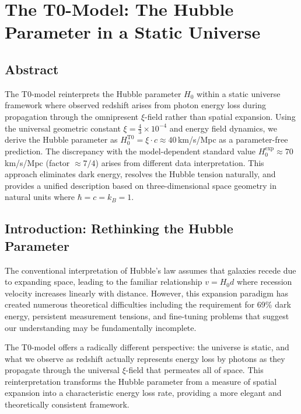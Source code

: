 \chapter{The T0-Model: The Hubble Parameter in a Static Universe \\}

\section*{Abstract}
		The T0-model reinterprets the Hubble parameter $H_0$ within a static universe framework where observed redshift arises from photon energy loss during propagation through the omnipresent $\xi$-field rather than spatial expansion. Using the universal geometric constant $\xi = \frac{4}{3} \times 10^{-4}$ and energy field dynamics, we derive the Hubble parameter as $H_0^{\text{T0}} = \xi \cdot c \approx 40\,$km/s/Mpc as a parameter-free prediction. The discrepancy with the model-dependent standard value $H_0^{\text{exp}} \approx 70\,$km/s/Mpc (factor $\approx 7/4$) arises from different data interpretation. This approach eliminates dark energy, resolves the Hubble tension naturally, and provides a unified description based on three-dimensional space geometry in natural units where $\hbar = c = k_B = 1$.

	

	\section{Introduction: Rethinking the Hubble Parameter}
	
	The conventional interpretation of Hubble's law assumes that galaxies recede due to expanding space, leading to the familiar relationship $v = H_0 d$ where recession velocity increases linearly with distance. However, this expansion paradigm has created numerous theoretical difficulties including the requirement for 69\% dark energy, persistent measurement tensions, and fine-tuning problems that suggest our understanding may be fundamentally incomplete.
	
	The T0-model offers a radically different perspective: the universe is static, and what we observe as redshift actually represents energy loss by photons as they propagate through the universal $\xi$-field that permeates all of space. This reinterpretation transforms the Hubble parameter from a measure of spatial expansion into a characteristic energy loss rate, providing a more elegant and theoretically consistent framework.
	
